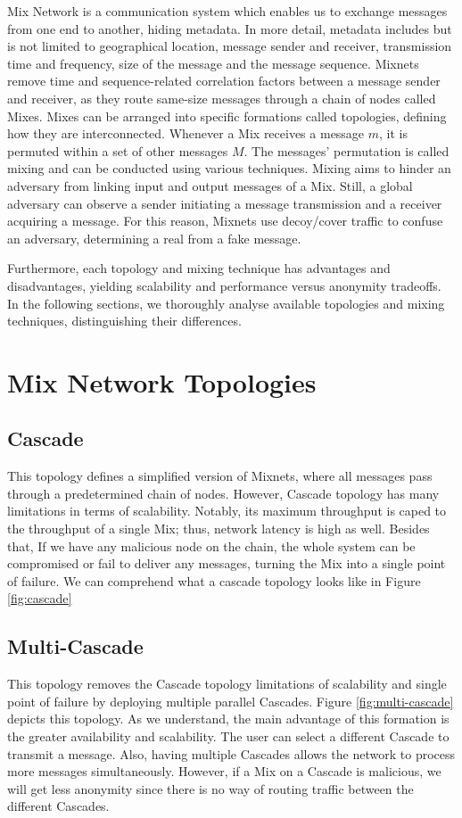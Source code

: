 \documentclass[logo,msc,cyber]{infthesis}   %
\begin{document}
Mix Network is a communication system which enables us to exchange messages from
one end to another, hiding metadata. In more detail, metadata includes but is
not limited to geographical location, message sender and receiver, transmission
time and frequency, size of the message and the message sequence. Mixnets remove
time and sequence-related correlation factors between a message sender and
receiver, as they route same-size messages through a chain of nodes called Mixes.
Mixes can be arranged into specific formations called topologies, defining how
they are interconnected. Whenever a Mix receives a message $m$, it is permuted
within a set of other messages $M$\cite{erodotos}. The messages' permutation is
called mixing and can be conducted using various techniques. Mixing aims to
hinder an adversary from linking input and output messages of a Mix. Still, a
global adversary can observe a sender initiating a message transmission and a
receiver acquiring a message. For this reason, Mixnets use decoy/cover traffic
to confuse an adversary, determining a real from a fake message. 

Furthermore, each topology and mixing technique has advantages and
disadvantages, yielding scalability and performance versus anonymity tradeoffs.
In the following sections, we thoroughly analyse available topologies
and mixing techniques, distinguishing their differences.


\section{Mix Network Topologies}

\subsection{Cascade}
This topology defines a simplified version of Mixnets, where all messages pass
through a predetermined chain of nodes\cite{chaum1981untraceable}. However,
Cascade topology has many limitations in terms of scalability. Notably, its
maximum throughput is caped to the throughput of a single Mix; thus, network
latency is high as well. Besides that, If we have any malicious node on the
chain, the whole system can be compromised or fail to deliver any messages,
turning the Mix into a single point of failure. We can comprehend what a cascade
topology looks like in Figure \ref{fig:cascade}

\subsection{Multi-Cascade}
This topology removes the Cascade topology limitations of scalability and single
point of failure by deploying multiple parallel Cascades. Figure
\ref{fig:multi-cascade} depicts this topology. As we understand, the main
advantage of this formation is the greater availability and
scalability\cite{chaum2017cmix,gelernter2017two}. The user can select a
different Cascade to transmit a message. Also, having multiple Cascades allows
the network to process more messages simultaneously. However, if a Mix on a
Cascade is malicious, we will get less anonymity since there is no way of
routing traffic between the different Cascades.
\end{document}
